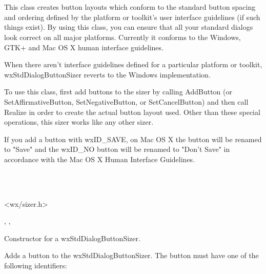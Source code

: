 \section{}\label{wxstddialogbuttonsizer}

This class creates button layouts which conform to the standard button spacing and ordering defined by the platform
or toolkit's user interface guidelines (if such things exist). By using this class, you can ensure that all your
standard dialogs look correct on all major platforms. Currently it conforms to the Windows, GTK+ and Mac OS X
human interface guidelines.

When there aren't interface guidelines defined for a particular platform or toolkit, wxStdDialogButtonSizer reverts
to the Windows implementation. 

To use this class, first add buttons to the sizer by calling AddButton (or SetAffirmativeButton, SetNegativeButton,
or SetCancelButton) and then call Realize in order to create the actual button layout used. Other than these special
operations, this sizer works like any other sizer. 

If you add a button with wxID\_SAVE, on Mac OS X the button will be renamed to "Save" and
the wxID\_NO button will be renamed to "Don't Save" in accordance with the Mac OS X Human Interface Guidelines.


\\
\\


<wx/sizer.h>


, , 

\label{wxstddialogbuttonsizerctor}


Constructor for a wxStdDialogButtonSizer.

\label{wxstddialogbuttonsizeraddbutton}


Adds a button to the wxStdDialogButtonSizer. The button must have one of the following identifiers:

